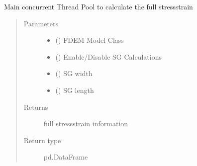 \documentclass[letterpaper,10pt,english]{sphinxmanual}
\begin{document}
\begin{fulllineitems}
\label{\detokenize{openfdem:openfdem.complete_BD_thread_pool_generators.main}}
Main concurrent Thread Pool to calculate the full stress\sphinxhyphen{}strain
\begin{quote}\begin{description}
\item[{Parameters}] \leavevmode\begin{itemize}
\item {} 
 ({\hyperref[\detokenize{openfdem:openfdem.openfdem.Model}]{}}) \textendash{} FDEM Model Class

\item {} 
 () \textendash{} Enable/Disable SG Calculations

\item {} 
 () \textendash{} SG width

\item {} 
 () \textendash{} SG length

\end{itemize}

\item[{Returns}] \leavevmode
full stress\sphinxhyphen{}strain information

\item[{Return type}] \leavevmode
pd.DataFrame

\end{description}\end{quote}

\end{fulllineitems}

\end{document}
